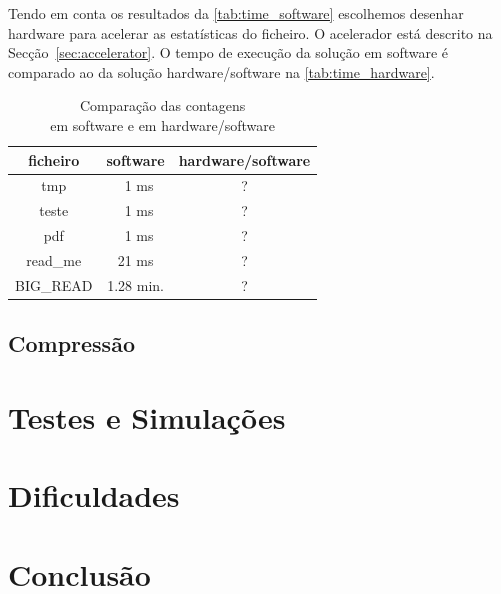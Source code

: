 \documentclass[a4paper]{article}
\begin{document}
	Tendo em conta os resultados da \autoref{tab:time_software} escolhemos desenhar hardware para acelerar as estatísticas do ficheiro. O acelerador está descrito na Secção~\ref{sec:accelerator}. O tempo de execução da solução em software é comparado ao da solução hardware/software na \autoref{tab:time_hardware}.
	
	
	\begin{table}
		\centering
		\caption{Comparação das contagens \\em software e em hardware/software}

		\begin{tabular}{|c|c|c|}
			\hline 
			ficheiro   & software   & hardware/software \\ \hline \hline 
			tmp        & \ 1 ms     & ?         \\ \hline
			teste      & \ 1 ms     & ?         \\ \hline
			pdf        & \ 1 ms     & ?         \\ \hline
			read\_me   & 21 ms      & ?         \\ \hline
			BIG\_READ  & 1.28 min.  & ?         \\ 
			\hline 
		\end{tabular}
		\label{tab:time_hardware}
	\end{table}
	
	
	\subsection{Compressão}
	
	\section{Testes e Simulações}
	
	\section{Dificuldades}	
	
	\section{Conclusão}


\end{document}
